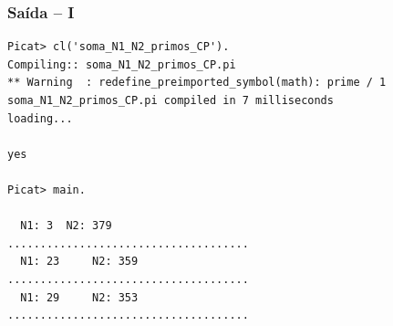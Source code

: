\begin{frame}[fragile]

\frametitle{Saída -- I}

\begin{footnotesize}
\begin{verbatim}
Picat> cl('soma_N1_N2_primos_CP').
Compiling:: soma_N1_N2_primos_CP.pi
** Warning  : redefine_preimported_symbol(math): prime / 1
soma_N1_N2_primos_CP.pi compiled in 7 milliseconds
loading...

yes

Picat> main.                      

  N1: 3	 N2: 379
.....................................
  N1: 23	 N2: 359
.....................................
  N1: 29	 N2: 353
.....................................
\end{verbatim}
    
\end{footnotesize}
\end{frame}


